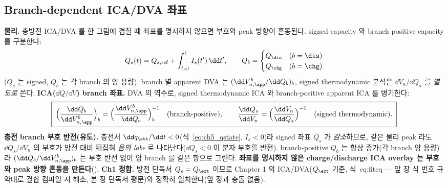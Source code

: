 \subsection{Branch-dependent ICA/DVA 좌표}\label{sec:ch5_icadva}
\textbf{물리.} 충방전 ICA/DVA 를 한 그림에 겹칠 때 좌표를 명시하지 않으면 부호와 peak 방향이 혼동된다. signed
capacity 와 branch positive capacity 를 구분한다:
\begin{equation}
Q_s(t)=Q_{s,\mathrm{ref}}+\int_{t_{\mathrm{ref}}}^t I_s(t')\,\dd t',\qquad
Q_b=\begin{cases}Q_\dis & (b=\dis)\\ Q_\chg & (b=\chg)\end{cases}
\label{eq:ch5_signed_cap}
\end{equation}
($Q_s$ 는 signed, $Q_b$ 는 각 branch 의 양 용량). branch 별 apparent DVA 는 $(\dd V_{n,\app}^b/\dd Q_b)_b$,
signed thermodynamic 분석은 $\dd V_n/\dd Q_s$ 를 \emph{별도로} 쓴다. \textbf{ICA($\dd Q/\dd V$) branch 좌표.}
DVA 의 역수로, signed thermodynamic ICA 와 branch-positive apparent ICA 를 병기한다:
\begin{equation}
\boxed{\;\Big(\frac{\dd Q_b}{\dd V_{n,\app}^b}\Big)_b=\Big(\frac{\dd V_{n,\app}^b}{\dd Q_b}\Big)_b^{-1}
\quad(\text{branch-positive}),\qquad
\frac{\dd Q_s}{\dd V_n}=\Big(\frac{\dd V_n}{\dd Q_s}\Big)^{-1}\quad(\text{signed thermodynamic}).\;}
\label{eq:ch5_branch_ica}
\end{equation}
\textbf{충전 branch 부호 반전(유도).} 충전서 $\dd q_\stt/\dd t<0$(식~\eqref{eq:ch5_qstate}, $I_s<0$)라 signed
좌표 $Q_s$ 가 \emph{감소}하므로, 같은 물리 peak 라도 $\dd Q_s/\dd V_n$ 의 부호가 방전 대비 뒤집혀 \emph{음의
lobe} 로 나타난다($\dd Q_s<0$ 이 분자 부호를 반전). branch-positive $Q_b$ 는 항상 증가(각 branch 양 용량)라
$(\dd Q_b/\dd V_{n,\app}^b)_b$ 는 부호 반전 없이 양 branch 를 같은 향으로 그린다. \textbf{좌표를 명시하지 않은
charge/discharge ICA overlay 는 부호와 peak 방향 혼동을 만든다}(). \textbf{Ch1 정합.} 방전 단독서
$Q_s=Q_\ext$ 이므로 Chapter 1 의 ICA/DVA($Q_\ext$ 기준, 식~eq:fiteq — 앞 장 식 번호 규약대로 결합 컴파일 시
해소, 본 장 단독서 평문)와 정확히 일치한다(앞 장과 충돌 없음).

